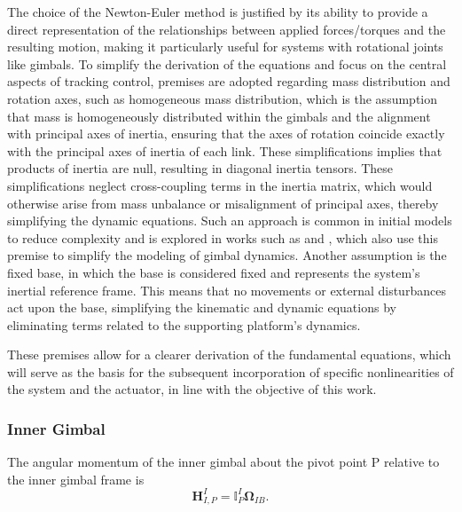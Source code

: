 The choice of the Newton-Euler method is justified by its ability to provide a direct representation of the relationships between applied forces/torques and the resulting motion, making it particularly useful for systems with rotational joints like gimbals. To simplify the derivation of the equations and focus on the central aspects of tracking control, premises are adopted regarding mass distribution and rotation axes, such as homogeneous mass distribution, which is the assumption that mass is homogeneously distributed within the gimbals and the alignment with principal axes of inertia, ensuring that the axes of rotation coincide exactly with the principal axes of inertia of each link. These simplifications implies that products of inertia are null, resulting in diagonal inertia tensors. These simplifications neglect cross-coupling terms in the inertia matrix, which would otherwise arise from mass unbalance or misalignment of principal axes, thereby simplifying the dynamic equations. Such an approach is common in initial models to reduce complexity and is explored in works such as  and , which also use this premise to simplify the modeling of gimbal dynamics. Another assumption is the fixed base, in which the base is considered fixed and represents the system's inertial reference frame. This means that no movements or external disturbances act upon the base, simplifying the kinematic and dynamic equations by eliminating terms related to the supporting platform's dynamics.

These premises allow for a clearer derivation of the fundamental equations, which will serve as the basis for the subsequent incorporation of specific nonlinearities of the system and the actuator, in line with the objective of this work.

\subsubsection{Inner Gimbal}
The angular momentum of the inner gimbal about the pivot point P relative to the inner gimbal frame is
\begin{equation}
   \mathbf{H}^I_{I,P} = \mathbb{I}^I_P \mathbf{\Omega}_{IB}.
\end{equation}

